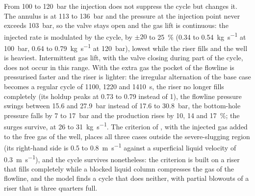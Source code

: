 \documentclass[a4paper,fleqn]{cas-sc}
\begin{document}
From 100 to \SI{120}{\bar} the injection does not suppress the cycle but changes it. The annulus is at 113 to \SI{136}{\bar} and the pressure at the injection point never exceeds \SI{103}{\bar}, so the valve stays open and the gas lift is continuous: the injected rate is modulated by the cycle, by $\pm 20$ to \SI{25}{\percent} (0.34 to \SI{0.54}{\kilogram\per\second} at \SI{100}{\bar}, 0.64 to \SI{0.79}{\kilogram\per\second} at \SI{120}{\bar}), lowest while the riser fills and the well is heaviest. Intermittent gas lift, with the valve closing during part of the cycle, does not occur in this range. With the extra gas the pocket of the flowline is pressurised faster and the riser is lighter: the irregular alternation of the base case becomes a regular cycle of 1100, 1220 and \SI{1410}{\second}, the riser no longer fills completely (its holdup peaks at 0.73 to 0.79 instead of 1), the flowline pressure swings between 15.6 and \SI{27.9}{\bar} instead of 17.6 to \SI{30.8}{\bar}, the bottom-hole pressure falls by 7 to \SI{17}{\bar} and the production rises by 10, 14 and \SI{17}{\percent}; the surges survive, at 26 to \SI{31}{\kilogram\per\second}. The criterion of \citet{boe1981}, with the injected gas added to the free gas of the well, places all three cases outside the severe-slugging region (its right-hand side is 0.5 to \SI{0.8}{\metre\per\second} against a superficial liquid velocity of \SI{0.3}{\metre\per\second}), and the cycle survives nonetheless: the criterion is built on a riser that fills completely while a blocked liquid column compresses the gas of the flowline, and the model finds a cycle that does neither, with partial blowouts of a riser that is three quarters full.
\end{document}
